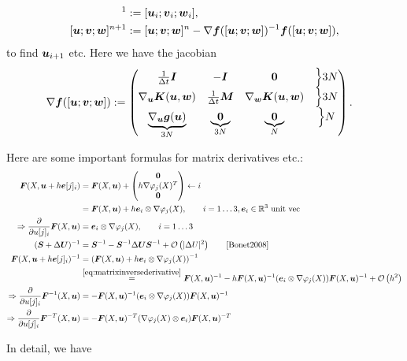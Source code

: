 \begin{align}
	[\vu; \vv; \vw]^1 &:= [\vu_i; \vv_i; \vw_i],\\
	[\vu; \vv; \vw]^{n+1} &:= [\vu; \vv; \vw]^{n} - \nabla \vf([\vu; \vv; \vw])^{-1}\vf([\vu; \vv; \vw]), 
\end{align}
to find $\boldsymbol{u}_{i+1}$ etc.
Here we have the jacobian
\begin{align}
	 \nabla \boldsymbol{f}([\boldsymbol{u}; \boldsymbol{v}; \boldsymbol{w}]) &:= \left(\begin{matrix}\frac{1}{\Delta t} \boldsymbol{I} & -\boldsymbol{I} & \boldsymbol{0} & \Bigl\rbrace3N\\
	 									\nabla_{\boldsymbol{u}}\boldsymbol{K}(\boldsymbol{u},\boldsymbol{w}) & \frac{1}{\Delta t}\boldsymbol{M} & \nabla_{\boldsymbol{w}}\boldsymbol{K}(\boldsymbol{u},\boldsymbol{w}) & \Bigl\rbrace3N\\
	 									\underbrace{\nabla_{\boldsymbol{u}}\boldsymbol{g}(\boldsymbol{u})}_{3N} & \underbrace{\boldsymbol{0}}_{3N} & \underbrace{\boldsymbol{0}}_{N} & \Bigl\rbrace N\end{matrix}\right).
\end{align}

Here are some important formulas for matrix derivatives etc.:
\begin{align}
	\vF(X,\vu + h\ve[j]_i) &= \vF(X,\vu) + \m{\vnull \\ h\dpj^T\\ \vnull}\leftarrow i\nonumber\\
	&= \vF(X,\vu) + h\ve_i\otimes\dpj,\qquad i=1\ldots3,\ve_i\in\R^3 \text{ unit vec}\nonumber\\
	\Rightarrow \d{}{u[j]_i}\vF(X,\vu) &= \ve_i\otimes\dpj,\qquad i=1\ldots3\nonumber\\
	(\vS+\Delta\vU)^{-1} &= \vS^{-1} - \vS^{-1}\Delta\vU\vS^{-1} + \O{|\Delta U|^2}\qquad\cite[p.57]{Bonet2008}\label{eq:matrixinversederivative}\\
	\vF(X,\vu + h\ve[j]_i)^{-1} &= \left(\vF(X,\vu) + h\ve_i\otimes\dpj\right)^{-1}\nonumber\\
		&\re{eq:matrixinversederivative}\vF(X,\vu)^{-1} - h\vF(X,\vu)^{-1}(\ve_i\otimes\dpj)\vF(X,\vu)^{-1} + \O{h^2}\nonumber\\
	\Rightarrow\d{}{u[j]_i}\vF^{-1}(X,\vu) &= -\vF(X,\vu)^{-1}(\ve_i\otimes\dpj)\vF(X,\vu)^{-1}\nonumber\\
	\Rightarrow\d{}{u[j]_i}\vF^{-T}(X,\vu) &= -\vF(X,\vu)^{-T}(\dpj\otimes\ve_i)\vF(X,\vu)^{-T}\nonumber
\end{align}

In detail, we have

